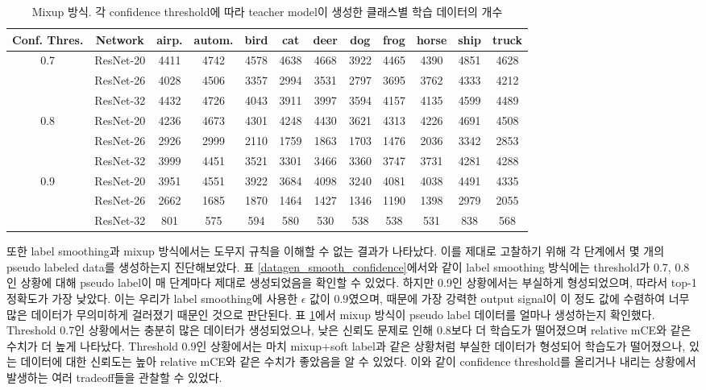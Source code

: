 \begin{table}[!h]
  \center
  \begin{tabular}{|c|c|cccccccccc|}
\hline
Conf. Thres. & Network & airp. & autom. & bird & cat & deer & dog & frog & horse & ship & truck \\ \hline
0.7 & ResNet-20 & 4411 & 4742 & 4578 & 4638 & 4668 & 3922 & 4465 & 4390 & 4851 & 4628 \\
    & ResNet-26 & 4028 & 4506 & 3357 & 2994 & 3531 & 2797 & 3695 & 3762 & 4333 & 4212 \\
    & ResNet-32 & 4432 & 4726 & 4043 & 3911 & 3997 & 3594 & 4157 & 4135 & 4599 & 4489 \\ \hline

0.8 & ResNet-20 & 4236 & 4673 & 4301 & 4248 & 4430 & 3621 & 4313 & 4226 & 4691 & 4508 \\ 
    & ResNet-26 & 2926 & 2999 & 2110 & 1759 & 1863 & 1703 & 1476 & 2036 & 3342 & 2853 \\
    & ResNet-32 & 3999 & 4451 & 3521 & 3301 & 3466 & 3360 & 3747 & 3731 & 4281 & 4288 \\ \hline

0.9 & ResNet-20 & 3951 & 4551 & 3922 & 3684 & 4098 & 3240 & 4081 & 4038 & 4491 & 4335 \\ 
    & ResNet-26 & 2662 & 1685 & 1870 & 1464 & 1427 & 1346 & 1190 & 1398 & 2979 & 2055 \\
    & ResNet-32 & 801 & 575 & 594 & 580 & 530 & 538 & 538 & 531 & 838 & 568 \\ \hline 
  \end{tabular}
  \caption{Mixup 방식. 각 confidence threshold에 따라 teacher model이 생성한 클래스별 학습 데이터의 개수}
  \label{datagen_mixup_confidence}
\end{table}

또한 label smoothing과 mixup 방식에서는 도무지 규칙을 이해할 수 없는 결과가 나타났다. 이를 제대로 고찰하기 위해 각 단계에서 몇 개의 pseudo labeled data를 생성하는지 진단해보았다. 표 \ref{datagen_smooth_confidence}에서와 같이 label smoothing 방식에는 threshold가 0.7, 0.8인 상황에 대해 pseudo label이 매 단계마다 제대로 생성되었음을 확인할 수 있었다. 하지만 0.9인 상황에서는 부실하게 형성되었으며, 따라서 top-1 정확도가 가장 낮았다. 이는 우리가 label smoothing에 사용한 $\epsilon$ 값이 $0.9$였으며, 때문에 가장 강력한 output signal이 이 정도 값에 수렴하여 너무 많은 데이터가 무의미하게 걸러졌기 때문인 것으로 판단된다. 표 \ref{datagen_mixup_confidence}에서 mixup 방식이 pseudo label 데이터를 얼마나 생성하는지 확인했다. Threshold 0.7인 상황에서는 충분히 많은 데이터가 생성되었으나, 낮은 신뢰도 문제로 인해 0.8보다 더 학습도가 떨어졌으며 relative mCE와 같은 수치가 더 높게 나타났다. Threshold 0.9인 상황에서는 마치 mixup+soft label과 같은 상황처럼 부실한 데이터가 형성되어 학습도가 떨어졌으나, 있는 데이터에 대한 신뢰도는 높아 relative mCE와 같은 수치가 좋았음을 알 수 있었다. 이와 같이 confidence threshold를 올리거나 내리는 상황에서 발생하는 여러 tradeoff들을 관찰할 수 있었다.

